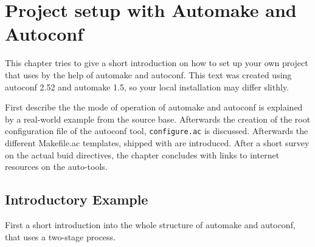 \chapter{Project setup with Automake and Autoconf}
\label{sec::new_project}

This chapter tries to give a short introduction on how to set up your
own project that uses \miro by the help of automake and autoconf.
This text was created using autoconf 2.52 and automake 1.5, so your
local installation may differ slithly.

First describe the the mode of operation of automake and autoconf is
explained by a real-world example from the \miro source
base. Afterwards the creation of the root configuration file of the
autoconf tool, {\tt configure.ac} is discussed. Afterwards the
different Makefile.ac templates, shipped with \miro are
introduced. After a short survey on the actual buid directives, the
chapter concludes with links to internet resources on the auto-tools.

\section{Introductory Example}

First a short introduction into the whole structure of automake and
autoconf, that uses a two-stage process.

